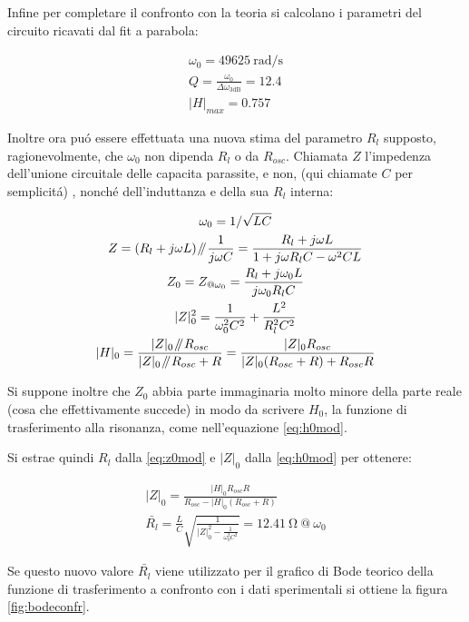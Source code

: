 \documentclass{article}
\newcommand{\pars}{\mathbin{\!/\mkern-5mu/\!}}
\begin{document}
Infine per completare il confronto con la teoria si calcolano i parametri del circuito ricavati dal fit a parabola:

\begin{gather}
	\omega_0 = 49625 \ \si{\radian\per\second} \\
	Q = \frac{\omega_0}{\Delta \omega_{\textrm{3dB}}} = 12.4 \\ 
	|H|_{max} = 0.757 
\end{gather}

Inoltre ora pu\'o essere effettuata una nuova stima del parametro $R_l$ supposto, ragionevolmente, che $\omega_0$ non dipenda $R_l$ o da $R_{osc}$.
Chiamata $Z$ l'impedenza dell'unione circuitale delle capacita parassite, e non, (qui chiamate $C$ per semplicit\'a) , nonch\'e dell'induttanza e della sua $R_l$ interna:

\begin{gather}
	\nonumber
	\omega_0=1/\sqrt{LC} \\ 
	\nonumber
	Z = (R_l + j\omega L) \pars \frac{1}{j \omega C} = \frac{R_l+j\omega L}{1+j \omega R_l C - \omega^2 C L}\\
	\nonumber
	Z_0 = Z_{@ \omega_0} =  \frac{R_l + j \omega_0 L}{j\omega_0 R_l C} \\
	\label{eq:z0mod}
	|Z|^2_{0} = \frac{1}{\omega_0^2 C^2} + \frac{L^2}{R_l^2 C^2} \\
	\label{eq:h0mod}
	|H|_{0} =\frac{|Z|_0 \pars R_{osc}}{|Z|_0 \pars R_{osc} + R} = \frac{|Z|_0 R_{osc}}{|Z|_0 (R_{osc} + R) +R_{osc} R}
\end{gather}

Si suppone inoltre che $Z_0$ abbia parte immaginaria molto minore della parte reale (cosa che effettivamente succede) in modo da scrivere $H_0$, la funzione di trasferimento alla risonanza, come nell'equazione \ref{eq:h0mod}.

Si estrae quindi $R_l$ dalla \ref{eq:z0mod} e $|Z|_0$ dalla \ref{eq:h0mod} per ottenere:

\begin{gather}
	|Z|_0 = \frac{|H|_0 R_{osc} R}{R_{osc} - |H|_0 (R_{osc}+R)} \\
	\bar{R_l} = \frac{L}{C} \sqrt{\frac{1}{|Z|^2_0 - \frac{1}{\omega_0^2 C^2}}} = 12.41 \ \si{\ohm} \ @ \ \omega_0
\end{gather}

Se questo nuovo valore $\bar{R_l}$ viene utilizzato per il grafico di Bode teorico della funzione di trasferimento a confronto con i dati sperimentali si ottiene la figura \ref{fig:bodeconfr}.
\end{document}
